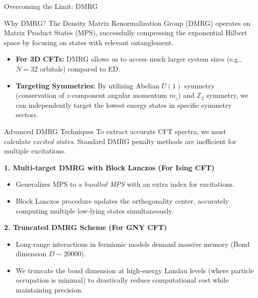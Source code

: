 \documentclass[aspectratio=169]{beamer}
\begin{document}
\begin{frame}{Overcoming the Limit: DMRG}
    \begin{block}{Why DMRG?}
        The Density Matrix Renormalization Group (DMRG) operates on Matrix Product States (MPS), successfully compressing the exponential Hilbert space by focusing on states with relevant entanglement.
    \end{block}
    \begin{itemize}
        \item \textbf{For 3D CFTs:} DMRG allows us to access much larger system sizes (e.g., $N=32$ orbitals) compared to ED.
        \item \textbf{Targeting Symmetries:} By utilizing Abelian $U(1)$ symmetry (conservation of $z$-component angular momentum $m_z$) and $\mathbb{Z}_2$ symmetry, we can independently target the lowest energy states in specific symmetry sectors.
    \end{itemize}
\end{frame}

\begin{frame}{Advanced DMRG Techniques}
    To extract accurate CFT spectra, we must calculate \textit{excited states}. Standard DMRG penalty methods are inefficient for multiple excitations.
    
    \vspace{0.3cm}
    \textbf{1. Multi-target DMRG with Block Lanczos (For Ising CFT)}
    \begin{itemize}
        \item Generalizes MPS to a \textit{bundled MPS} with an extra index for excitations.
        \item Block Lanczos procedure updates the orthogonality center, accurately computing multiple low-lying states simultaneously.
    \end{itemize}
    
    \textbf{2. Truncated DMRG Scheme (For GNY CFT)}
    \begin{itemize}
        \item Long-range interactions in fermionic models demand massive memory (Bond dimension $D \sim 20000$).
        \item We truncate the bond dimension at high-energy Landau levels (where particle occupation is minimal) to drastically reduce computational cost while maintaining precision.
    \end{itemize}
\end{frame}
\end{document}
